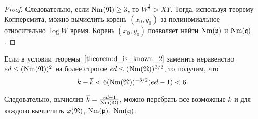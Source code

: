 \documentclass[_00_dissertation.tex]{subfiles}
\begin{document}
\begin{proof}
    Следовательно, если $\textrm{Nm}(\mathfrak{N}) \ge 3$, то $W^{\frac{3}{2}} > XY$.
    Тогда, используя теорему Копперсмита, можно вычислить корень $(x_0, y_0)$ за полиномиальное относительно $\log W$ время.
    Корень $(x_0, y_0)$ позволяет найти $\textrm{Nm}(\mathfrak{p})$ и $\textrm{Nm}(\mathfrak{q})$.
\end{proof}

\begin{remark}
    Если в условии теоремы~$\ref{theorem:d_is_known_2}$ заменить неравенство $ed \le (\textrm{Nm}(\mathfrak{N}))^2$ на более строгое $e d \le (\textrm{Nm}(\mathfrak{N}))^{3/2}$, то получим, что
    \begin{equation*}
        k - \overline{k} < 6(\textrm{Nm}(\mathfrak{N}))^{-3/2}(ed-1) < 6.
    \end{equation*}
    
    Следовательно, вычислив $\overline{k} = \frac{ed-1}{\textrm{Nm}(\mathfrak{N})}$, можно перебрать все возможные $k$ и для каждого вычислить $\varphi(\mathfrak{N})$, $\textrm{Nm}(\mathfrak{p})$, $\textrm{Nm}(\mathfrak{q})$.
\end{remark}
\end{document}
